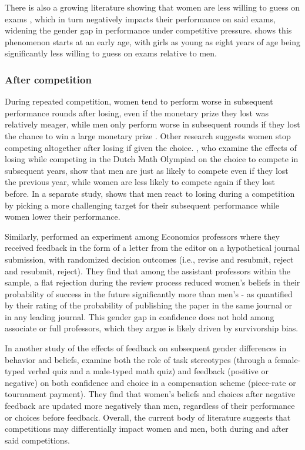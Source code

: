 \documentclass[letterpaper, nobind]{templates/ociamthesis}
\begin{document}
There is also a growing literature showing that women are less willing to guess on exams \autocite{Pekkarinen2015,Baldiga2014,Iriberri2021}, which in turn negatively impacts their performance on said exams, widening the gender gap in performance under competitive pressure. \textcite{Riener2018} shows this phenomenon starts at an early age, with girls as young as eight years of age being significantly less willing to guess on exams relative to men.

\hypertarget{after-competition}{%
\subsubsection{After competition}\label{after-competition}}

During repeated competition, women tend to perform worse in subsequent performance rounds after losing, even if the monetary prize they lost was relatively meager, while men only perform worse in subsequent rounds if they lost the chance to win a large monetary prize \autocite{Gill2014}. Other research suggests women stop competing altogether after losing if given the choice. \textcite{Buser2019}, who examine the effects of losing while competing in the Dutch Math Olympiad on the choice to compete in subsequent years, show that men are just as likely to compete even if they lost the previous year, while women are less likely to compete again if they lost before. In a separate study, \textcite{Buser2016} shows that men react to losing during a competition by picking a more challenging target for their subsequent performance while women lower their performance.

Similarly, \textcite{Shastry2021} performed an experiment among Economics professors where they received feedback in the form of a letter from the editor on a hypothetical journal submission, with randomized decision outcomes (i.e., revise and resubmit, reject and resubmit, reject). They find that among the assistant professors within the sample, a flat rejection during the review process reduced women's beliefs in their probability of success in the future significantly more than men's - as quantified by their rating of the probability of publishing the paper in the same journal or in any leading journal. This gender gap in confidence does not hold among associate or full professors, which they argue is likely driven by survivorship bias.

In another study of the effects of feedback on subsequent gender differences in behavior and beliefs, \textcite{Coffman2021} examine both the role of task stereotypes (through a female-typed verbal quiz and a male-typed math quiz) and feedback (positive or negative) on both confidence and choice in a compensation scheme (piece-rate or tournament payment). They find that women's beliefs and choices after negative feedback are updated more negatively than men, regardless of their performance or choices before feedback. Overall, the current body of literature suggests that competitions may differentially impact women and men, both during and after said competitions.
\end{document}
